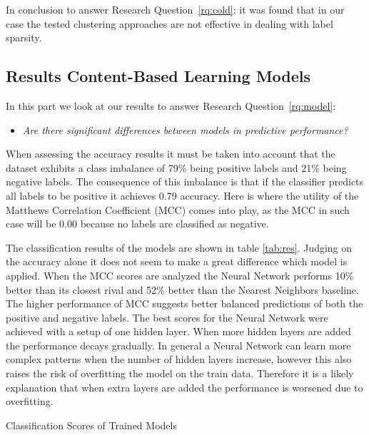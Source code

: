In conclusion to answer Research Question~\ref{rq:cold}: it was found that in our case the tested clustering approaches are not effective in dealing with label sparsity.

\subsection{Results Content-Based Learning Models}
\label{ssec:rcblm}

In this part we look at our results to answer Research Question~\ref{rq:model}:
\begin{itemize}
	\item[] \em Are there significant differences between models in predictive performance?
\end{itemize}

\noindent When assessing the accuracy results it must be taken into account that the dataset exhibits a class imbalance of 79\% being positive labels and 21\% being negative labels.
The consequence of this imbalance is that if the classifier predicts all labels to be positive it achieves 0.79 accuracy.
Here is where the utility of the Matthews Correlation Coefficient (MCC) comes into play, as the MCC in such case will be 0.00 because no labels are classified as negative.

The classification results of the models are shown in table \ref{tab:res}.
Judging on the accuracy alone it does not seem to make a great difference which model is applied.
When the MCC scores are analyzed the Neural Network performs 10\% better than its closest rival and 52\% better than the Nearest Neighbors baseline.
The higher performance of MCC suggests better balanced predictions of both the positive and negative labels.
The best scores for the Neural Network were achieved with a setup of one hidden layer.
When more hidden layers are added the performance decays gradually.
In general a Neural Network can learn more complex patterns when the number of hidden layers increase, however this also raises the risk of overfitting the model on the train data.
Therefore it is a likely explanation that when extra layers are added the performance is worsened due to overfitting.

\begin{table}[h]
\begin{footnotesize}

\end{footnotesize}
\caption{\label{tab:res} \footnotesize{Classification Scores of Trained Models}}
\end{table}

